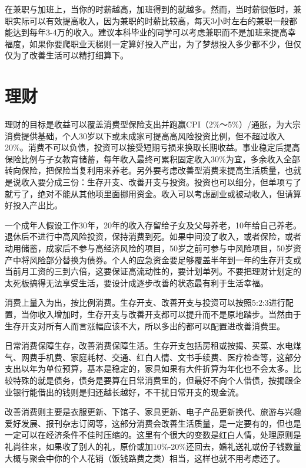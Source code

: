 \documentclass[
  letterpaper,
  DIV=11,
  numbers=noendperiod]{scrreprt}
\begin{document}
在兼职与加班上，当你的时薪越高，加班得到的就越多。然而，当时薪很低时，兼职实际可以有效提高收入，因为兼职的时薪比较高，每天3小时左右的兼职一般都能达到每年3-4万的收入。建议本科毕业的同学可以考虑兼职而不是加班来提高幸福度，如果你要爬职业天梯则一定算好投入产出，为了梦想投入多少都不少，但仅仅为了改善生活可以精打细算下。

\section{理财}\label{ux7406ux8d22}

理财的目标是收益可以覆盖消费型保险支出并跑赢CPI（2\%～5\%）/通胀，为大宗消费提供基础，个人30岁以下或未成家可提高高风险投资比例，但不超过收入20\%。消费不可以负债，投资可以接受短期亏损来换取长期收益。事业稳定后提高保险比例与子女教育储蓄，每年收入最终可累积固定收入30\%为宜，多余收入全部转向保险，把保险当复利用来养老。另外要考虑改善型消费来提高生活质量，也就是说收入要分成三份：生存开支、改善开支与投资。投资也可以细分，但单项亏了就亏了，绝对不能从其他项里面挪用资金。收入可以考虑副业或被动收入，但请算好投入产出比。

一个成年人假设工作30年，20年的收入存留给子女及父母养老，10年给自己养老。退休后不进行中高风险投资，保持消费到死。如果中间没了收入，或者保险，或者动用储蓄，成家后不参与高经济风险的项目，50岁之前可参与中风险项目，50岁资产中将风险部分替换为债券。个人的应急资金要足够覆盖半年到一年的生存开支或当前月工资的三到六倍，这要保证高流动性的，要计划单列。不要把理财计划定的太死板搞得无法享受生活，要设计成逐步改善的状态最有利于生活幸福。

消费上量入为出，按比例消费。生存开支、改善开支与投资可以按照5:2:3进行配置，当你收入增加时，生存开支与改善开支都可以提升而不是原地踏步。当然由于生存开支对所有人而言涨幅应该不大，所以多出的都可以配置进改善消费里。

日常消费保障生存，改善消费保障生活。生存开支包括房租或按揭、买菜、水电煤气、网费手机费、家庭耗材、交通、红白人情、文书手续费、医疗检查等，这部分支出以年为单位预算，基本是稳定的，家具如果有大件折算为年化也不会太多。比较特殊的就是债务，债务是要算在日常消费里的，但最好不向个人借债，按揭跟企业银行能借出的钱则是归还越长越好，不干扰日常开支的现金流。

改善消费则主要是衣服更新、下馆子、家具更新、电子产品更新换代、旅游与兴趣爱好发展、报刊杂志订阅等，这部分消费会改善生活质量，是一定要有的，但也是一定可以在经济条件不佳时压缩的。这里有个很大的变数是红白人情，处理原则是礼尚往来，如果收了别人的礼，原价或加10\%-20\%还回去，婚礼送礼或份子钱数量大概与聚会中你的个人花销（饭钱路费之类）相当，这样也就不用考虑还了。
\end{document}
